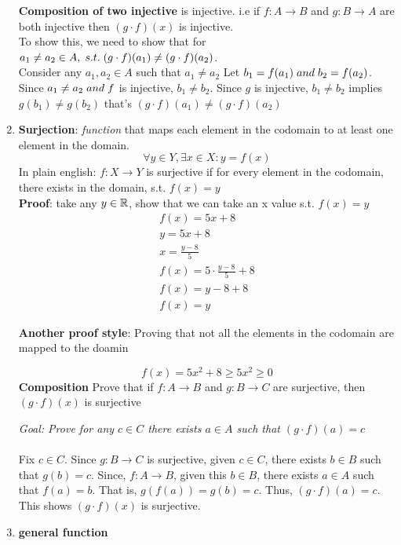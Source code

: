 \documentclass[11pt]{article}
\begin{document}
\begin{enumerate}
    \textbf{Composition of two injective} is injective. i.e if $f: A \rightarrow B$ and $g:B \rightarrow A$ are both injective then $(g \cdot f)(x)$ is injective. \\ To show this, we need to show that for $a_{1} \not = a_{2} \in A, \hspace{1.0mm} s.t. \hspace{1.0mm} (g \cdot f)(a_{1}) \not = (g \cdot f)(a_{2})$. \\ Consider any $a_{1}, a_{2}\in A$ such that $a_{1} \not = a_{2}$
    Let $b_{1} = f(a_{1}) \hspace{1.0mm} and \hspace{1.0mm} b_{2} = f(a_{2})$. Since $a_{1} \not = a_{2} \hspace{1.0mm} and \hspace{1.0mm} f$ is injective, $b_{1} \not = b_{2}$. Since $g$ is injective, $b_{1} \not = b_{2}$ implies $g(b_{1}) \not = g(b_{2})$ that's  $(g \cdot f)(a_{1}) \not = (g \cdot f)(a_{2})$

    \item \textbf{Surjection}: \textit{function} that maps each element in the codomain to at least one element in the domain.
    \begin{equation}
        \forall y \in Y, \exists x \in X: y = f(x)
    \end{equation}
    In plain english: $f: X \rightarrow Y$ is surjective if for every element in the codomain, there exists in the domain, s.t. $f(x) = y$ \\
    \textbf{Proof}: take any $y \in \mathbb{R}$, show that we can take an x value s.t. $f(x) =y$
    \begin{equation}
        \begin{aligned}
            f(x) = 5x+8 \\
            y = 5x + 8 \\
            x = \frac{y-8}{5} \\
            f(x) = 5 \cdot{\frac{y-8}{5} + 8} \\
            f(x) = y - 8 + 8 \\
            f(x) = y
        \end{aligned}
    \end{equation}

    \textbf{Another proof style}: Proving that not all the elements in the codomain are mapped to the doamin

    \begin{equation}
        f(x) = 5x^2 + 8 \geq 5x^2 \geq 0
    \end{equation}
    \textbf{Composition} Prove that if $f:A \rightarrow B$ and $g:B \rightarrow C$ are surjective, then $(g \cdot f)(x)$ is surjective

    \textit{Goal: Prove for any $c \in C$ there exists $a \in A$ such that
    $(g \cdot f)(a) = c$} \\ \\

    Fix $c \in C$. Since $g: B \rightarrow C$ is surjective, given $c \in C$, there exists $b \in B$ such that $g(b) = c$. Since, $f: A \rightarrow B$, given this $b \in B$, there exists $a \in A$ such that $f(a) = b$. That is, $g(f(a)) = g(b) = c$. Thus, $(g \cdot f)(a) = c$. This shows $(g \cdot f)(x)$ is surjective.
    \item \textbf{general function}
\end{enumerate}
\end{document}
